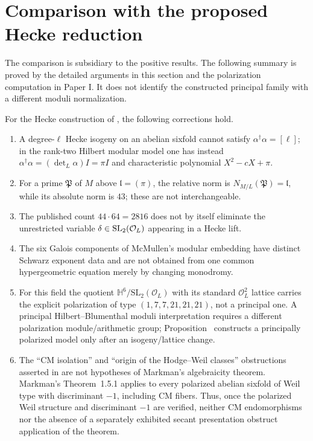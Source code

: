 \section{Comparison with the proposed Hecke reduction}
The comparison is subsidiary to the positive results. The following
summary is proved by the detailed arguments in this section and the
polarization computation in Paper I. It does not identify the constructed
principal family with a different moduli normalization.

\begin{theoremB}\label{thm:B}
For the Hecke construction of \cite[Sec.~5]{Mostaed2026}, the following corrections hold.
\begin{enumerate}[label=(\roman*)]
\item A degree-$\ell$ Hecke isogeny on an abelian sixfold cannot satisfy $\alpha^\dagger\alpha=[\ell]$; in the rank-two Hilbert modular model one has instead $\alpha^\dagger\alpha=(\det_L\alpha)I=\pi I$ and characteristic polynomial $X^2-cX+\pi$.
\item For a prime $\mathfrak P$ of $M$ above $\mathfrak l=(\pi)$, the relative norm is $N_{M/L}(\mathfrak P)=\mathfrak l$, while its absolute norm is $43$; these are not interchangeable.
\item The published count $44\cdot64=2816$ does not by itself eliminate the unrestricted variable $\delta\in\mathrm{SL}_2(\mathcal O_L)$ appearing in a Hecke lift.
\item The six Galois components of McMullen's modular embedding have distinct Schwarz exponent data and are not obtained from one common hypergeometric equation merely by changing monodromy.
\item For this field the quotient $\mathbb H^6/\mathrm{SL}_2(\mathcal O_L)$ with its standard $\mathcal O_L^2$ lattice carries the explicit polarization of type $(1,7,7,21,21,21)$, not a principal one.  A principal Hilbert--Blumenthal moduli interpretation requires a different polarization module/arithmetic group; Proposition~ constructs a principally polarized model only after an isogeny/lattice change.
\item The ``CM isolation'' and ``origin of the Hodge--Weil classes'' obstructions asserted in \cite[Obs.~4.6]{Mostaed2026} are not hypotheses of Markman's algebraicity theorem.  Markman's Theorem~1.5.1 applies to every polarized abelian sixfold of Weil type with discriminant $-1$, including CM fibers.  Thus, once the polarized Weil structure and discriminant $-1$ are verified, neither CM endomorphisms nor the absence of a separately exhibited secant presentation obstruct application of the theorem.

\end{enumerate}
\end{theoremB}
